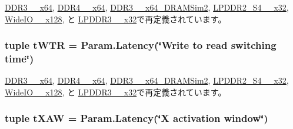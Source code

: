 \hyperlink{classDRAMCtrl_1_1DDR3__1600__x64_a9d8360f5123eaf9b5b6013adca83d1ae}{DDR3\_\_\-x64}, \hyperlink{classDRAMCtrl_1_1DDR4__2400__x64_a9d8360f5123eaf9b5b6013adca83d1ae}{DDR4\_\_\-x64}, \hyperlink{classDRAMCtrl_1_1DDR3__1333__x64__DRAMSim2_a9d8360f5123eaf9b5b6013adca83d1ae}{DDR3\_\_\-x64\_\-DRAMSim2}, \hyperlink{classDRAMCtrl_1_1LPDDR2__S4__1066__x32_a9d8360f5123eaf9b5b6013adca83d1ae}{LPDDR2\_\-S4\_\_\-x32}, \hyperlink{classDRAMCtrl_1_1WideIO__200__x128_a9d8360f5123eaf9b5b6013adca83d1ae}{WideIO\_\_\-x128}, と \hyperlink{classDRAMCtrl_1_1LPDDR3__1600__x32_a9d8360f5123eaf9b5b6013adca83d1ae}{LPDDR3\_\_\-x32}で再定義されています。\hypertarget{classDRAMCtrl_1_1DRAMCtrl_aab12a5441587fc9009b2cd7b83865f92}{
\subsubsection[{tWTR}]{\setlength{\rightskip}{0pt plus 5cm}tuple {\bf tWTR} = Param.Latency(\char`\"{}Write to read switching time\char`\"{})}}
\label{classDRAMCtrl_1_1DRAMCtrl_aab12a5441587fc9009b2cd7b83865f92}


\hyperlink{classDRAMCtrl_1_1DDR3__1600__x64_a3c80caef2fc7879e455259bd9390d6d1}{DDR3\_\_\-x64}, \hyperlink{classDRAMCtrl_1_1DDR4__2400__x64_a3c80caef2fc7879e455259bd9390d6d1}{DDR4\_\_\-x64}, \hyperlink{classDRAMCtrl_1_1DDR3__1333__x64__DRAMSim2_a3c80caef2fc7879e455259bd9390d6d1}{DDR3\_\_\-x64\_\-DRAMSim2}, \hyperlink{classDRAMCtrl_1_1LPDDR2__S4__1066__x32_a3c80caef2fc7879e455259bd9390d6d1}{LPDDR2\_\-S4\_\_\-x32}, \hyperlink{classDRAMCtrl_1_1WideIO__200__x128_a3c80caef2fc7879e455259bd9390d6d1}{WideIO\_\_\-x128}, と \hyperlink{classDRAMCtrl_1_1LPDDR3__1600__x32_a3c80caef2fc7879e455259bd9390d6d1}{LPDDR3\_\_\-x32}で再定義されています。\hypertarget{classDRAMCtrl_1_1DRAMCtrl_a7de8ac1f9497dea29b2aaab67a0fb1cc}{
\subsubsection[{tXAW}]{\setlength{\rightskip}{0pt plus 5cm}tuple {\bf tXAW} = Param.Latency(\char`\"{}X activation window\char`\"{})}}
\label{classDRAMCtrl_1_1DRAMCtrl_a7de8ac1f9497dea29b2aaab67a0fb1cc}


